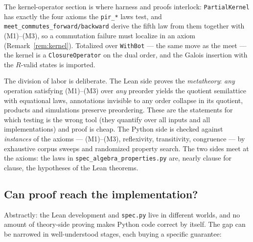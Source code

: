 \documentclass[11pt]{article}
\theoremstyle{definition}
\theoremstyle{remark}
\newcommand{\code}[1]{\texttt{#1}}
\begin{document}
The kernel-operator section is where harness and proofs interlock:
\code{PartialKernel} has exactly the four axioms the \code{pir\_*} laws
test, and \code{meet\_commutes\_forward/backward} derive the fifth law
from them together with (M1)--(M3), so a commutation failure must localize
in an axiom (Remark~\ref{rem:kernel}).  Totalized over \code{WithBot} ---
the same move as the meet --- the kernel is a \code{ClosureOperator} on
the dual order, and the Galois insertion with the $R$-valid states is
imported.

The division of labor is deliberate.  The Lean side proves the
\emph{metatheory}: \emph{any} operation satisfying (M1)--(M3) over
\emph{any} preorder yields the quotient semilattice with equational laws,
annotations invisible to any order collapse in its quotient, products and
simulations preserve preordering.  These are the statements for which testing
is the wrong tool (they quantify over all inputs and all implementations)
and proof is cheap.  The Python side is checked against \emph{instances} of
the axioms --- (M1)--(M3), reflexivity, transitivity, congruence --- by
exhaustive corpus sweeps and randomized property search.  The two sides meet
at the axioms: the laws in \code{spec\_algebra\_properties.py} are, nearly
clause for clause, the hypotheses of the Lean theorems.

\subsection{Can proof reach the implementation?}\label{sec:bridge}

Abstractly: the Lean development and \code{spec.py} live in different worlds,
and no amount of theory-side proving makes Python code correct by itself.
The gap can be narrowed in well-understood stages, each buying a specific
guarantee:
\end{document}
